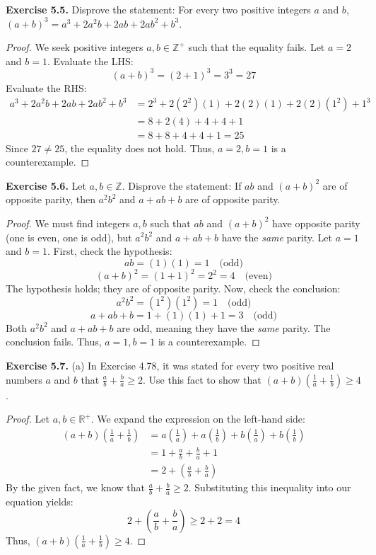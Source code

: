 \documentclass[11pt, letterpaper]{article}
\theoremstyle{remark}
\newcommand{\R}{\mathbb{R}}
\newcommand{\Z}{\mathbb{Z}}
\begin{document}
\textbf{Exercise 5.5.} Disprove the statement: For every two positive integers $a$ and $b$, $(a+b)^3 = a^3 + 2a^2b + 2ab + 2ab^2 + b^3$.
\begin{proof}
We seek positive integers $a, b \in \Z^+$ such that the equality fails.
Let $a = 2$ and $b = 1$.
Evaluate the LHS:
\[ (a+b)^3 = (2+1)^3 = 3^3 = 27 \]
Evaluate the RHS:
\begin{align*}
a^3 + 2a^2b + 2ab + 2ab^2 + b^3 &= 2^3 + 2(2^2)(1) + 2(2)(1) + 2(2)(1^2) + 1^3 \\
&= 8 + 2(4) + 4 + 4 + 1 \\
&= 8 + 8 + 4 + 4 + 1 = 25
\end{align*}
Since $27 \neq 25$, the equality does not hold. Thus, $a = 2, b = 1$ is a counterexample.
\end{proof}

\textbf{Exercise 5.6.} Let $a, b \in \Z$. Disprove the statement: If $ab$ and $(a+b)^2$ are of opposite parity, then $a^2b^2$ and $a+ab+b$ are of opposite parity.
\begin{proof}
We must find integers $a, b$ such that $ab$ and $(a+b)^2$ have opposite parity (one is even, one is odd), but $a^2b^2$ and $a+ab+b$ have the \textit{same} parity.
Let $a = 1$ and $b = 1$.
First, check the hypothesis:
\[ ab = (1)(1) = 1 \quad \text{(odd)} \]
\[ (a+b)^2 = (1+1)^2 = 2^2 = 4 \quad \text{(even)} \]
The hypothesis holds; they are of opposite parity.
Now, check the conclusion:
\[ a^2b^2 = (1^2)(1^2) = 1 \quad \text{(odd)} \]
\[ a+ab+b = 1 + (1)(1) + 1 = 3 \quad \text{(odd)} \]
Both $a^2b^2$ and $a+ab+b$ are odd, meaning they have the \textit{same} parity. The conclusion fails. Thus, $a = 1, b = 1$ is a counterexample.
\end{proof}

\textbf{Exercise 5.7.} 
(a) In Exercise 4.78, it was stated for every two positive real numbers $a$ and $b$ that $\frac{a}{b} + \frac{b}{a} \ge 2$. Use this fact to show that $(a+b)\left(\frac{1}{a} + \frac{1}{b}\right) \ge 4$.
\begin{proof}
Let $a, b \in \R^+$. We expand the expression on the left-hand side:
\begin{align*}
(a+b)\left(\frac{1}{a} + \frac{1}{b}\right) &= a\left(\frac{1}{a}\right) + a\left(\frac{1}{b}\right) + b\left(\frac{1}{a}\right) + b\left(\frac{1}{b}\right) \\
&= 1 + \frac{a}{b} + \frac{b}{a} + 1 \\
&= 2 + \left(\frac{a}{b} + \frac{b}{a}\right)
\end{align*}
By the given fact, we know that $\frac{a}{b} + \frac{b}{a} \ge 2$. Substituting this inequality into our equation yields:
\[ 2 + \left(\frac{a}{b} + \frac{b}{a}\right) \ge 2 + 2 = 4 \]
Thus, $(a+b)\left(\frac{1}{a} + \frac{1}{b}\right) \ge 4$.
\end{proof}
\end{document}
